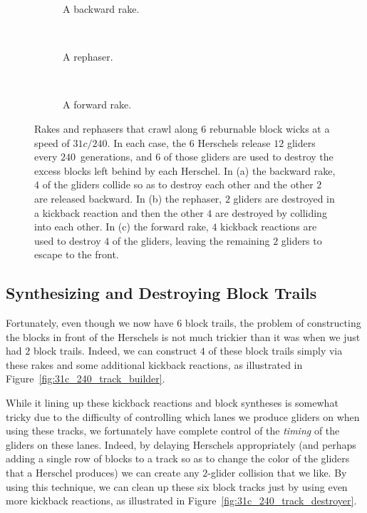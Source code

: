 \begin{figure}[!htb]
	\centering
	\begin{subfigure}{0.28\textwidth}
		\centering
		\caption{A backward rake.}\label{fig:31c_240_back_rake}
	\end{subfigure} \ \ \begin{subfigure}{0.28\textwidth}
		\centering
		\caption{A rephaser.}\label{fig:31c_240_rephaser}
	\end{subfigure} \ \ \begin{subfigure}{0.4\textwidth}
		\centering
		\caption{A forward rake.}\label{fig:31c_240_forward_rake}
	\end{subfigure}
	\caption{Rakes and rephasers that crawl along $6$ reburnable block wicks at a speed of $31c/240$. In each case, the $6$ Herschels release $12$ gliders every $240$~generations, and $6$ of those gliders are used to destroy the excess blocks left behind by each Herschel. In (a) the backward rake, $4$ of the gliders collide so as to destroy each other and the other $2$ are released backward. In (b) the rephaser, $2$ gliders are destroyed in a kickback reaction and then the other $4$ are destroyed by colliding into each other. In (c) the forward rake, $4$ kickback reactions are used to destroy $4$ of the gliders, leaving the remaining $2$ gliders to escape to the front.}\label{fig:31c_240_rakes_and_rephaser}
\end{figure}


\subsection{Synthesizing and Destroying Block Trails}\label{sec:silverfish_synth_destroy_blocks}

Fortunately, even though we now have $6$ block trails, the problem of constructing the blocks in front of the Herschels is not much trickier than it was when we just had $2$ block trails. Indeed, we can construct $4$ of these block trails simply via these rakes and some additional kickback reactions, as illustrated in Figure~\ref{fig:31c_240_track_builder}.

While it lining up these kickback reactions and block syntheses is somewhat tricky due to the difficulty of controlling which lanes we produce gliders on when using these tracks, we fortunately have complete control of the \emph{timing} of the gliders on these lanes. Indeed, by delaying Herschels appropriately (and perhaps adding a single row of blocks to a track so as to change the color of the gliders that a Herschel produces) we can create any $2$-glider collision that we like. By using this technique, we can clean up these six block tracks just by using even more kickback reactions, as illustrated in Figure~\ref{fig:31c_240_track_destroyer}.

